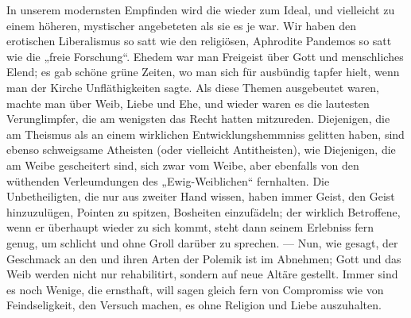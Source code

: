 In unserem modernsten Empfinden wird die  wieder zum Ideal, und vielleicht zu einem höheren, mystischer angebeteten als sie es je war. Wir haben den erotischen Liberalismus so satt wie den religiösen, Aphrodite Pandemos so satt wie die „freie Forschung“. Ehedem war man Freigeist über Gott und menschliches Elend; es gab schöne grüne Zeiten, wo man sich für ausbündig tapfer hielt, wenn man der Kirche Unfläthigkeiten sagte. Als diese Themen ausgebeutet waren, machte man  über Weib, Liebe und Ehe, und wieder waren es die lautesten Verunglimpfer, die am wenigsten das Recht hatten mitzureden. Diejenigen, die am Theismus als an einem wirklichen Entwicklungshemmniss gelitten haben, sind ebenso schweigsame Atheisten (oder vielleicht Antitheisten), wie Diejenigen, die am Weibe gescheitert sind, sich zwar vom Weibe, aber ebenfalls von den wüthenden Verleumdungen des „Ewig-Weiblichen“ fernhalten. Die Unbetheiligten, die nur aus zweiter Hand wissen, haben immer Geist, den Geist hinzuzulügen, Pointen zu spitzen, Bosheiten einzufädeln; der wirklich Betroffene, wenn er überhaupt wieder zu sich kommt, steht dann seinem Erlebniss fern genug, um schlicht und ohne Groll darüber zu sprechen. — Nun, wie gesagt, der Geschmack an den  und ihren Arten der Polemik ist im Abnehmen; Gott und das Weib werden nicht nur rehabilitirt, sondern auf neue Altäre gestellt. Immer sind es noch Wenige, die ernsthaft, will sagen gleich fern von Compromiss wie von Feindseligkeit, den Versuch machen, es ohne Religion und Liebe auszuhalten.
\par

